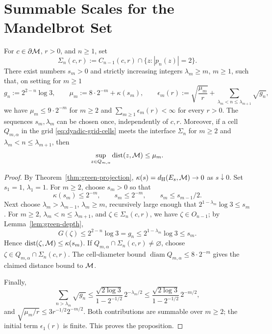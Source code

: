 \section{Summable Scales for the Mandelbrot Set}

\begin{proposition}
\label{prop:mandelbrot-green-block-scales}
For \(c\in\partial\mathcal M\), \(r>0\), and \(n\ge1\), set
\begin{equation}
 \Sigma_n(c,r):=C_{n-1}(c,r)\cap\{z:|p_n(z)|=2\}.
 \label{eq:green-separator}
\end{equation}
There exist numbers \(s_m>0\) and strictly increasing integers
\(\lambda_m\ge m\), \(m\ge1\), such that, on setting for \(m\ge1\)
\[
 g_n:=2^{2-n}\log3,\qquad
 \mu_m:=8\cdot2^{-m}+\kappa(s_m),\qquad
 \epsilon_m(r):=
 \sqrt{\frac{\mu_m}{r}}+
 \sum_{\lambda_m<n\le\lambda_{m+1}}\sqrt{g_n},
\]
we have \(\mu_m\le9\cdot2^{-m}\) for \(m\ge2\) and
\(\sum_{m\ge1}\epsilon_m(r)<\infty\) for every \(r>0\). The sequences
\(s_m,\lambda_m\) can be chosen once, independently of \(c,r\).
Moreover, if a cell \(Q_{m,\alpha}\) in the grid
\eqref{eq:dyadic-grid-cells} meets the interface \(\Sigma_n\) for
\(m\ge2\) and \(\lambda_m<n\le\lambda_{m+1}\), then
\[
 \sup_{z\in Q_{m,\alpha}}\operatorname{dist}(z,\mathcal M)\le\mu_m.
\]
\end{proposition}
\begin{proof}
By Theorem~\ref{thm:green-projection},
\(\kappa(s)=d_{\mathrm H}(E_s,\mathcal M)\to0\) as \(s\downarrow0\). Set
\(s_1=1\), \(\lambda_1=1\). For \(m\ge2\), choose \(s_m>0\) so that
\[
 \kappa(s_m)\le2^{-m},\qquad s_m\le2^{-m},\qquad
 s_m\le s_{m-1}/2.
\]
Next choose \(\lambda_m>\lambda_{m-1}\), \(\lambda_m\ge m\),
recursively large enough that \(2^{1-\lambda_m}\log3\le s_m\). For
\(m\ge2\), \(\lambda_m<n\le\lambda_{m+1}\), and
\(\zeta\in\Sigma_n(c,r)\), we have \(\zeta\in O_{n-1}\); by
Lemma~\ref{lem:green-depth},
\[
 G(\zeta)\le2^{2-n}\log3=g_n
 \le2^{1-\lambda_m}\log3\le s_m.
\]
Hence \(\operatorname{dist}(\zeta,\mathcal M)\le\kappa(s_m)\). If
\(Q_{m,\alpha}\cap\Sigma_n(c,r)\ne\varnothing\), choose
\(\zeta\in Q_{m,\alpha}\cap\Sigma_n(c,r)\). The cell-diameter bound
\(\operatorname{diam}Q_{m,\alpha}\le8\cdot2^{-m}\) gives the claimed
distance bound to \(\mathcal M\).

Finally,
\[
 \sum_{n>\lambda_m}\sqrt{g_n}
 \le\frac{\sqrt{2\log3}}{1-2^{-1/2}}\,2^{-\lambda_m/2}
 \le\frac{\sqrt{2\log3}}{1-2^{-1/2}}\,2^{-m/2},
\]
and \(\sqrt{\mu_m/r}\le3r^{-1/2}2^{-m/2}\). Both contributions are
summable over \(m\ge2\); the initial term \(\epsilon_1(r)\) is finite.
This proves the proposition.
\end{proof}

